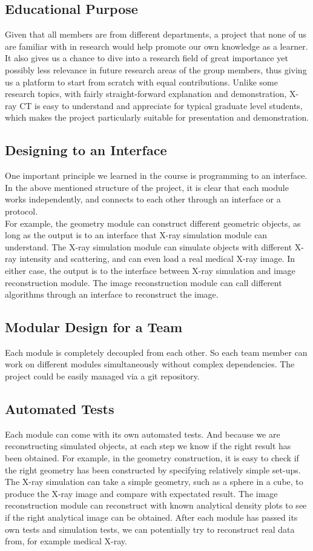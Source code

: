 \documentclass[11]{article}
\begin{document}
\subsection{Educational Purpose}
	Given that all members are from different departments, a project that none of us are familiar with in research would help promote our own knowledge as a learner. It also gives us a chance to dive into a research field of great importance yet possibly less relevance in future research areas of the group members, thus giving us a platform to start from scratch with equal contributions. Unlike some research topics, with fairly straight-forward explanation and demonstration, X-ray CT is easy to understand and appreciate for typical graduate level students, which makes the project particularly suitable for presentation and demonstration.
	
\subsection{Designing to an Interface}
	One important principle we learned in the course is programming to an interface. In the above mentioned structure of the project, it is clear that each module works independently, and connects to each other through an interface or a protocol.\\ For example, the geometry module can construct different geometric objects, as long as the output is to an interface that X-ray simulation module can understand. 	The X-ray simulation module can simulate objects with different X-ray intensity and scattering, and can even load a real medical X-ray image. In either case, the output is to the interface between X-ray simulation and image reconstruction module. The image reconstruction module can call different algorithms through an interface to reconstruct the image.

\subsection{Modular Design for a Team}
	Each module is completely decoupled from each other. So each team member can work on different modules simultaneously without complex dependencies. The project could be easily managed via a git repository. 

\subsection{Automated Tests}
	Each module can come with its own automated tests. And because we are reconstructing simulated objects, at each step we know if the right result has been obtained. For example, in the geometry construction, it is easy to check if the right geometry has been constructed by specifying relatively simple set-ups. The X-ray simulation can take a simple geometry, such as a sphere in a cube, to produce the X-ray image and compare with expectated result. The image reconstruction module can reconstruct with known analytical density plots to see if the right analytical image can be obtained. After each module has passed its own tests and simulation tests, we can potentially try to reconstruct real data from, for example medical X-ray.
\end{document}
